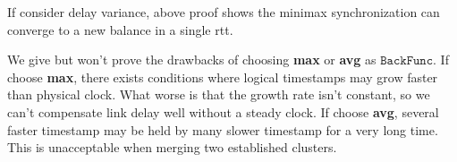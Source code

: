 \begin{note}
	If consider delay variance, above proof shows the minimax synchronization can converge to a new balance in a single rtt.
\end{note}

\begin{note}
	We give but won't prove the drawbacks of choosing \textbf{max} or \textbf{avg} as $\texttt{BackFunc}$.
	If choose \textbf{max}, there exists conditions where logical timestamps may grow faster than physical clock.
	What worse is that the growth rate isn't constant, so we can't compensate link delay well without a steady clock.
	If choose \textbf{avg}, several faster timestamp may be held by many slower timestamp for a very long time.
	This is unacceptable when merging two established clusters.
\end{note}